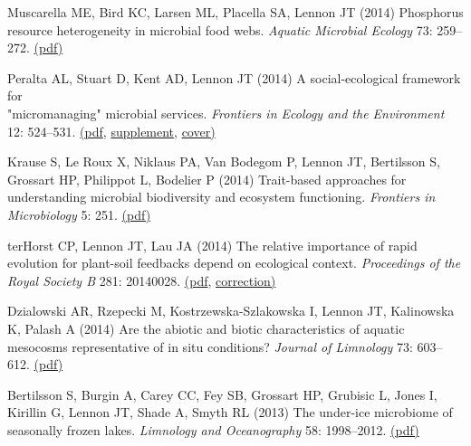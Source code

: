 \documentclass[11pt]{article}
\begin{document}
\begin{etaremune}
\item Muscarella ME, Bird KC, Larsen ML, Placella SA, Lennon JT (2014) Phosphorus resource heterogeneity in microbial food webs. \textit{Aquatic Microbial Ecology} 73: 259–272. \href{https://lennonlab.github.io/assets/publications/Muscarella_etal_2014.pdf}{(pdf)}

\item Peralta AL, Stuart D, Kent AD, Lennon JT (2014) A social-ecological framework for \\ "micromanaging" microbial services. \textit{Frontiers in Ecology and the Environment} 12: 524–531. \href{https://lennonlab.github.io/assets/publications/Peralta_etal_2014.pdf}{(pdf}, \href{https://lennonlab.github.io/assets/publications/Peralta_etal_2014_Suppl.pdf}{supplement}, \href{https://lennonlab.github.io/assets/publications/Peralta_etal_2014_Cover.pdf}{cover)}

\item Krause S, Le Roux X, Niklaus PA, Van Bodegom P, Lennon JT, Bertilsson S, Grossart HP, Philippot L, Bodelier P (2014) Trait-based approaches for understanding microbial biodiversity and ecosystem functioning. \textit{Frontiers in Microbiology} 5: 251. \href{https://lennonlab.github.io/assets/publications/Krause_etal_2014.pdf}{(pdf)}

\item terHorst CP, Lennon JT, Lau JA (2014) The relative importance of rapid evolution for plant-soil feedbacks depend on ecological context. \textit{Proceedings of the Royal Society B} 281: 20140028. \href{https://lennonlab.github.io/assets/publications/terHorst_etal_2014.pdf}{(pdf}, \href{https://lennonlab.github.io/assets/publications/terHorst_etal_2014_correction.pdf}{correction)}

\item Dzialowski AR, Rzepecki M, Kostrzewska-Szlakowska I, Lennon JT, Kalinowska K, Palash A (2014) Are the abiotic and biotic characteristics of aquatic mesocosms representative of in situ conditions? \textit{Journal of Limnology} 73: 603–612. \href{https://lennonlab.github.io/assets/publications/Dzialowski_etal_2014.pdf}{(pdf)}

\item Bertilsson S, Burgin A, Carey CC, Fey SB, Grossart HP, Grubisic L, Jones I, Kirillin G, Lennon JT, Shade A, Smyth RL (2013) The under-ice microbiome of seasonally frozen lakes. \textit{Limnology and Oceanography} 58: 1998–2012. \href{https://lennonlab.github.io/assets/publications/Bertilsson_etal_2013.pdf}{(pdf)}


\end{etaremune}
\end{document}
